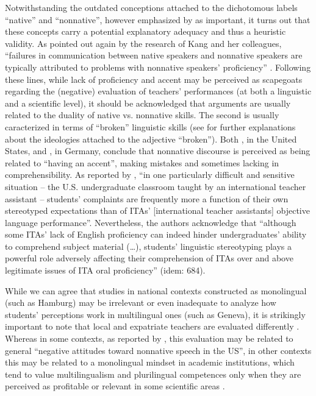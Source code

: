 \documentclass[output=paper]{../langscibook}
\begin{document}
Notwithstanding the outdated conceptions attached to the dichotomous labels “native” and “nonnative”, however emphasized by \citet{Derivry2006} as important, it turns out that these concepts carry a potential explanatory adequacy and thus a heuristic validity. As pointed out again by the research of Kang and her colleagues, “failures in communication between native speakers and nonnative speakers are typically attributed to problems with nonnative speakers’ proficiency” \citep[681]{KangEtAl2015}. Following these lines, while lack of proficiency and accent may be perceived as scapegoats regarding the (negative) evaluation of teachers’ performances (at both a linguistic and a scientific level), it should be acknowledged that arguments are usually related to the duality of native vs. nonnative skills. The second is usually caracterized in terms of “broken” linguistic skills (see \citealt{LindemannMoran2017} for further explanations about the ideologies attached to the adjective “broken”). Both \citet{LindemannMoran2017}, in the United States, and \citet{Melo-Pfeifer2017}, in Germany, conclude that nonnative discourse is perceived as being related to “having an accent”, making mistakes and sometimes lacking in comprehensibility. As reported by \citet[682]{KangEtAl2015}, “in one particularly difficult and sensitive situation – the U.S. undergraduate classroom taught by an international teacher assistant – students’ complaints are frequently more a function of their own stereotyped expectations than of ITAs’ [international teacher assistants] objective language performance”. Nevertheless, the authors acknowledge that “although some ITAs’ lack of English proficiency can indeed hinder undergraduates’ ability to comprehend subject material (…), students’ linguistic stereotyping plays a powerful role adversely affecting their comprehension of ITAs over and above legitimate issues of ITA oral proficiency” (idem: 684).

While we can agree that studies in national contexts constructed as monolingual (such as Hamburg) may be irrelevant or even inadequate to analyze how students’ perceptions work in multilingual ones (such as Geneva), it is strikingly important to note that local and expatriate teachers are evaluated differently \citep{Subtirelu2015}. Whereas in some contexts, as reported by \citet[650]{LindemannMoran2017}, this evaluation may be related to general “negative attitudes toward nonnative speech in the US”, in other contexts this may be related to a monolingual mindset in academic institutions, which tend to value multilingualism and plurilingual competences only when they are perceived as profitable or relevant in some scientific areas \citep{BerthoudEtAl2013,Gajo2013,Melo-Pfeifer2017,YanaprasartLüdi2018}.
\end{document}
